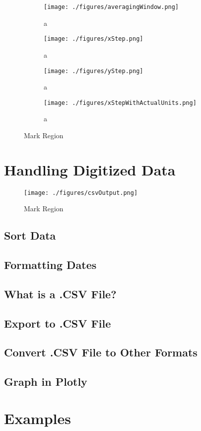 \documentclass[letterpaper, 10pt]{article}
\begin{document}
\begin{figure}
\begin{subfigure}[b]{0.3\textwidth}
\texttt{[image: ./figures/averagingWindow.png]}
\caption{a}
\end{subfigure}
\begin{subfigure}[b]{0.3\textwidth}
\texttt{[image: ./figures/xStep.png]}
\caption{a}
\end{subfigure}
\begin{subfigure}[b]{0.3\textwidth}
\texttt{[image: ./figures/yStep.png]}
\caption{a}
\end{subfigure}
\centering
\begin{subfigure}[b]{0.3\textwidth}
\texttt{[image: ./figures/xStepWithActualUnits.png]}
\caption{a}
\end{subfigure}
\caption{Mark Region}
\label{fig:markRegion}

\end{figure}

\section{Handling Digitized Data}
\begin{figure}
\begin{center}
\texttt{[image: ./figures/csvOutput.png]}
\caption{Mark Region}
\label{fig:csvOutput}
\end{center}
\end{figure}
\subsection{Sort Data}
\subsection{Formatting Dates}
\subsection{What is a .CSV File?}
\subsection{Export to .CSV File}
\subsection{Convert .CSV File to Other Formats}
\subsection{Graph in Plotly}
\section{Examples}
\end{document}
